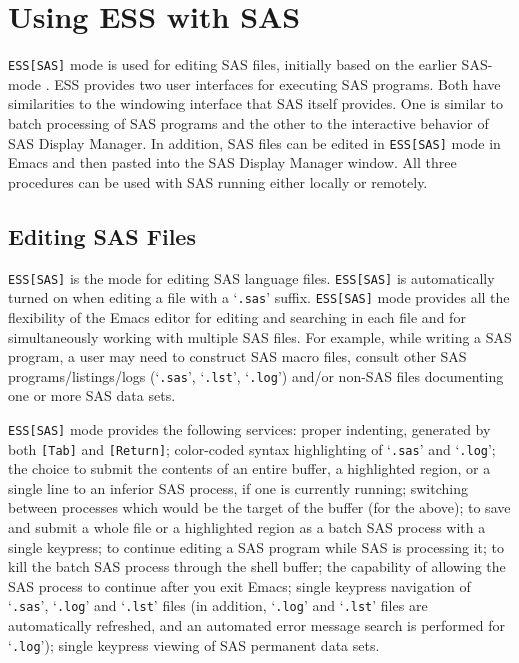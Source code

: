 \documentclass{article}
\newcommand{\stexttt}[1]{{\small\texttt{#1}}}
\newcommand{\ssf}[1]{{\small\sf{#1}}}
\newcommand{\file}[1]{`\stexttt{#1}'}
\begin{document}
\section{Using ESS with SAS}
\label{sec:SAS}

\stexttt{ESS[SAS]} mode is used for editing SAS files, initially based
on the earlier SAS-mode \cite{SASMODE}.  ESS provides two user
interfaces for executing SAS programs.  Both have similarities to the
windowing interface that SAS itself provides.  One is similar to batch
processing of SAS programs and the other to the interactive behavior
of SAS Display Manager.  In addition, SAS files can be edited in
\stexttt{ESS[SAS]} mode in Emacs and then pasted into the SAS Display
Manager \ssf{Program Editor} window.  All three procedures can be used
with SAS running either locally or remotely.

\subsection{Editing SAS Files}
\label{sec:SAS:edit}

\stexttt{ESS[SAS]} is the mode for editing SAS language files.
\stexttt{ESS[SAS]} is automatically turned on when editing a file with
a \file{.sas} suffix.  \stexttt{ESS[SAS]} mode provides all the
flexibility of the Emacs editor for editing and searching in each file
and for simultaneously working with multiple SAS files.  For example,
while writing a SAS program, a user may need to construct SAS macro
files, consult other SAS programs/listings/logs (\file{.sas}, \file{.lst},
\file{.log}) and/or non-SAS files documenting one or more SAS data sets.

\stexttt{ESS[SAS]} mode provides the following services: proper
indenting, generated by both \stexttt{[Tab]} and \stexttt{[Return]};
color-coded syntax highlighting of \file{.sas} and \file{.log}; the
choice to submit the contents of an entire buffer, a highlighted
region, or a single line to an inferior SAS process, if one is
currently running; switching between processes which would be the
target of the buffer (for the above); to save and submit a whole file
or a highlighted region as a batch SAS process with a single keypress;
to continue editing a SAS program while SAS is processing it; to kill
the batch SAS process through the shell buffer; the capability of
allowing the SAS process to continue after you exit Emacs; single
keypress navigation of \file{.sas}, \file{.log} and \file{.lst} files
(in addition, \file{.log} and \file{.lst} files are automatically
refreshed, and an automated error message search is performed for
\file{.log}); single keypress viewing of SAS permanent data sets.
\end{document}
